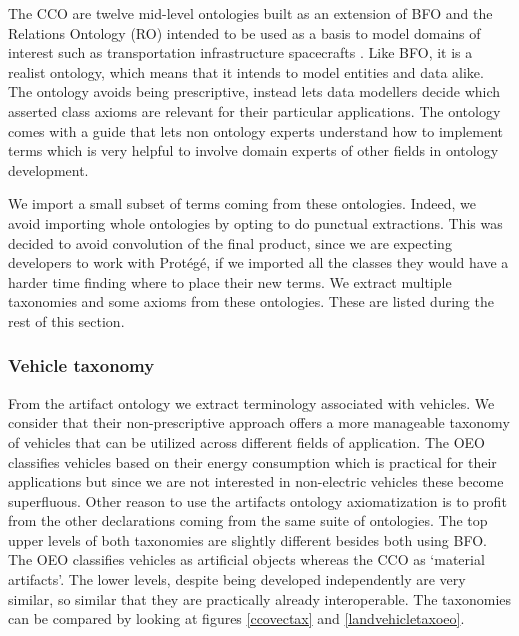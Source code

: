 The CCO are twelve mid-level ontologies built as an extension of BFO and the
Relations Ontology (RO) intended to be used as a basis to model domains of
interest such as transportation infrastructure spacecrafts
\cite{Rudnicki.23September2020}. Like BFO, it is a realist ontology, which
means that it intends to model entities and data alike. The ontology avoids
being prescriptive, instead lets data modellers decide which asserted class
axioms are relevant for their particular applications. The ontology comes with
a guide that lets non ontology experts understand how to implement terms which
is very helpful to involve domain experts of other fields in ontology
development.

We import a small subset of terms coming from these ontologies. Indeed, we
avoid importing whole ontologies by opting to do punctual extractions. This was
decided to avoid convolution of the final product, since we are expecting
developers to work with Protégé, if we imported all the classes they would have
a harder time finding where to place their new terms. We extract multiple
taxonomies and some axioms from these ontologies. These are listed during the
rest of this section.

\subsubsection{Vehicle taxonomy}

From the artifact ontology we extract terminology associated with vehicles. We
consider that their non-prescriptive approach offers a more manageable taxonomy
of vehicles that can be utilized across different fields of application. The
OEO classifies vehicles based on their energy consumption which is practical
for their applications but since we are not interested in non-electric vehicles
these become superfluous. Other reason to use the artifacts ontology
axiomatization is to profit from the other declarations coming from the same
suite of ontologies. The top upper levels of both taxonomies are slightly
different besides both using BFO. The OEO classifies vehicles as artificial
objects whereas the CCO as `material artifacts'. The lower levels, despite
being developed independently are very similar, so similar  that they are
practically already interoperable. The taxonomies can be compared by looking at
figures \ref{ccovectax} and \ref{landvehicletaxoeo}.

